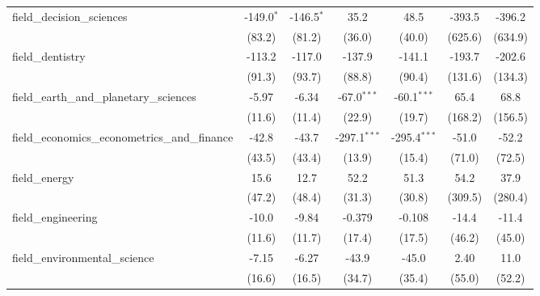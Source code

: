 \begin{tabular}{lcccccc}
   field\_decision\_sciences                                   & -149.0$^{*}$ & -146.5$^{*}$ & 35.2           & 48.5           & -393.5  & -396.2\\   
                                                               & (83.2)       & (81.2)       & (36.0)         & (40.0)         & (625.6) & (634.9)\\   
   field\_dentistry                                            & -113.2       & -117.0       & -137.9         & -141.1         & -193.7  & -202.6\\   
                                                               & (91.3)       & (93.7)       & (88.8)         & (90.4)         & (131.6) & (134.3)\\   
   field\_earth\_and\_planetary\_sciences                      & -5.97        & -6.34        & -67.0$^{***}$  & -60.1$^{***}$  & 65.4    & 68.8\\   
                                                               & (11.6)       & (11.4)       & (22.9)         & (19.7)         & (168.2) & (156.5)\\   
   field\_economics\_econometrics\_and\_finance                & -42.8        & -43.7        & -297.1$^{***}$ & -295.4$^{***}$ & -51.0   & -52.2\\   
                                                               & (43.5)       & (43.4)       & (13.9)         & (15.4)         & (71.0)  & (72.5)\\   
   field\_energy                                               & 15.6         & 12.7         & 52.2           & 51.3           & 54.2    & 37.9\\   
                                                               & (47.2)       & (48.4)       & (31.3)         & (30.8)         & (309.5) & (280.4)\\   
   field\_engineering                                          & -10.0        & -9.84        & -0.379         & -0.108         & -14.4   & -11.4\\   
                                                               & (11.6)       & (11.7)       & (17.4)         & (17.5)         & (46.2)  & (45.0)\\   
   field\_environmental\_science                               & -7.15        & -6.27        & -43.9          & -45.0          & 2.40    & 11.0\\   
                                                               & (16.6)       & (16.5)       & (34.7)         & (35.4)         & (55.0)  & (52.2)\\   

\end{tabular}
